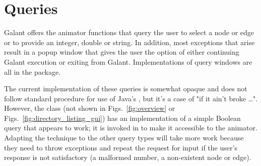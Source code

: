 \section{Queries} \label{sec:queries}

Galant offers the animator functions that query the user to select a node or
edge or to provide an integer, double or string. In addition, most exceptions
that arise result in a popup window that gives the user the option of either
continuing Galant execution or exiting from Galant.
Implementations of query windows are all in the  package.

The current implementation of these queries is somewhat opaque and does not
follow standard procedure for use of Java's , but it's a
case of "if it ain't broke \ldots".
However, the class  (not shown in Figs.~\ref{fig:overview} or
Figs.~\ref{fig:directory_listing_gui}) has an implementation of a simple
Boolean query that appears to work; it is invoked in  to make
it accessible to the animator.
Adapting the technique to the other query types will take more work because
they need to throw exceptions and repeat the request for input if the user's
response is not satisfactory (a malformed number, a non-existent node or edge).

